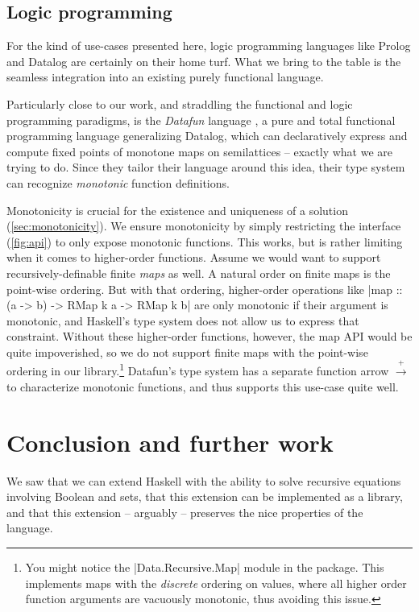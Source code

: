 \documentclass[manuscript,anonymous,screen,acmsmall]{acmart}
\begin{document}
\subsection{Logic programming}

For the kind of use-cases presented here, logic programming languages like Prolog and Datalog are certainly on their home turf. What we bring to the table is the seamless integration into an existing purely functional language.

Particularly close to our work, and straddling the functional and logic programming paradigms, is the \emph{Datafun} language \citep{datafun}, a pure and total functional programming language generalizing Datalog, which can declaratively express and compute fixed points of monotone maps on semilattices -- exactly what we are trying to do. Since they tailor their language around this idea, their type system can recognize \emph{monotonic} function definitions.

Monotonicity is crucial for the existence and uniqueness of a solution (\cref{sec:monotonicity}). We ensure monotonicity by simply restricting the interface (\cref{fig:api}) to only expose monotonic functions. This works, but is rather limiting when it comes to higher-order functions. Assume we would want to support recursively-definable finite \emph{maps} as well. A natural order on finite maps is the point-wise ordering. But with that ordering, higher-order operations like |map :: (a -> b) -> RMap k a -> RMap k b| are only monotonic if their argument is monotonic, and Haskell's type system does not allow us to express that constraint. Without these higher-order functions, however, the map API would be quite impoverished, so we do not support finite maps with the point-wise ordering in our library.\footnote{You might notice the |Data.Recursive.Map| module in the package. This implements maps with the \emph{discrete} ordering on values, where all higher order function arguments are vacuously monotonic, thus avoiding this issue.} Datafun's type system has a separate function arrow $\xrightarrow{+}$ to characterize monotonic functions, and thus supports this use-case quite well.

\section{Conclusion and further work}

We saw that we can extend Haskell with the ability to solve recursive equations involving Boolean and sets, that this extension can be implemented as a library, and that this extension -- arguably -- preserves the nice properties of the language.
\end{document}
